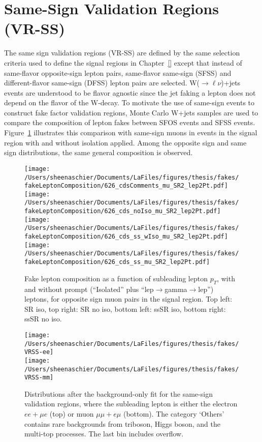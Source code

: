  \FloatBarrier

\section{Same-Sign Validation Regions (VR-SS)}
\label{sec:ssvr}
The same sign validation regions (VR-SS) are defined by the same selection criteria used to define the signal regions in Chapter~\ref{} except that instead of same-flavor opposite-sign lepton pairs, same-flavor same-sign (SFSS) and different-flavor same-sign (DFSS) lepton pairs are selected.  W($\rightarrow\ell\nu$)+jets events are understood to be flavor agnostic since the jet faking a lepton does not depend on the flavor of the W-decay.  To motivate the use of same-sign events to construct fake factor validation regions, Monte Carlo W+jets samples are used to compare the composition of lepton fakes between SFOS events and SFSS events.  Figure~\ref{fig:muMC} illustrates this comparison with same-sign muons in events in the signal region with and without isolation applied.  Among the opposite sign and same sign distributions, the same general composition is observed.  
\begin{figure}[htb]
        \centering
        \texttt{[image: /Users/sheenaschier/Documents/LaFiles/figures/thesis/fakes/fakeLeptonComposition/626\_cdsComments\_mu\_SR2\_lep2Pt.pdf]}
       \texttt{[image: /Users/sheenaschier/Documents/LaFiles/figures/thesis/fakes/fakeLeptonComposition/626\_cds\_noIso\_mu\_SR2\_lep2Pt.pdf]}
      \texttt{[image: /Users/sheenaschier/Documents/LaFiles/figures/thesis/fakes/fakeLeptonComposition/626\_cds\_ss\_wIso\_mu\_SR2\_lep2Pt.pdf]}
      \texttt{[image: /Users/sheenaschier/Documents/LaFiles/figures/thesis/fakes/fakeLeptonComposition/626\_cds\_ss\_mu\_SR2\_lep2Pt.pdf]}
        \caption{Fake lepton composition as a function of subleading lepton $p_{T}$, with and without prompt (``Isolated'' plus ``lep$\to$gamma$\to$lep'') leptons, for opposite sign muon pairs in the signal region.  Top left: SR iso, top right: SR no iso, bottom left: ssSR iso, bottom right: ssSR no iso.}
        \label{fig:muMC}
\end{figure}

\begin{figure}[htb]
        \centering
      \texttt{[image: /Users/sheenaschier/Documents/LaFiles/figures/thesis/fakes/VRSS-ee]}\\
      \texttt{[image: /Users/sheenaschier/Documents/LaFiles/figures/thesis/fakes/VRSS-mm]}
        \caption{Distributions after the background-only fit for the same-sign validation regions, where the subleading lepton is either the electron $ee+\mu e$ (top) or muon $\mu\mu+e\mu$ (bottom). The category `Others' contains rare backgrounds from triboson, Higgs boson, and the multi-top processes. The last bin includes overflow.}
        \label{fig:VRSS-el}
\end{figure}

